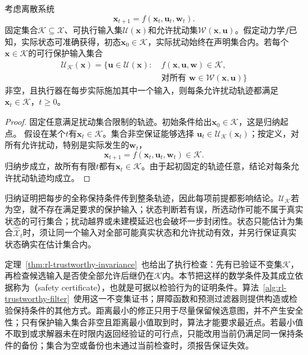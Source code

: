 \begin{theorem}[安全集的一步封闭性保证]
  \label{thm:rl-trustworthy-invariance}
  考虑离散系统
  \[
    \bm{x}_{t+1}=f(\bm{x}_t,\bm{u}_t,\bm{w}_t).
  \]
  固定集合$\mathcal K\subseteq\mathcal X$、可执行输入集$\mathcal U(\bm{x})$和允许扰动集$\mathcal W(\bm{x},\bm{u})$。假定动力学$f$已知，实际状态可准确获得，初态$\bm{x}_0\in\mathcal K$，实际扰动始终在声明集合内。若每个$\bm{x}\in\mathcal K$的可行保护输入集合
  \[
    \begin{aligned}
      \mathcal U_{\mathcal K}(\bm{x})
        =\bigl\{\bm{u}\in\mathcal U(\bm{x}):\ &
          f(\bm{x},\bm{u},\bm{w})\in\mathcal K,\\
        &\text{对所有 }\bm{w}\in\mathcal W(\bm{x},\bm{u})\bigr\}
    \end{aligned}
  \]
  非空，且执行器在每步实际施加其中一个输入，则每条允许扰动轨迹都满足$\bm{x}_t\in\mathcal K$，$t\geq0$。
\end{theorem}
\begin{proof}
  固定任意满足扰动集合限制的轨迹。初始条件给出$\bm{x}_0\in\mathcal K$，这是归纳起点。
  假设在某个$t$有$\bm{x}_t\in\mathcal K$。集合非空保证能够选择
  $\bm{u}_t\in\mathcal U_{\mathcal K}(\bm{x}_t)$；按定义，对所有允许扰动，特别是实际发生的$\bm{w}_t$，
  \[
    \bm{x}_{t+1}=f(\bm{x}_t,\bm{u}_t,\bm{w}_t)\in\mathcal K.
  \]
  归纳步成立，故所有有限$t$都有$\bm{x}_t\in\mathcal K$。由于起初固定的轨迹任意，结论对每条允许扰动轨迹均成立。
\end{proof}

归纳证明把每步的全称保持条件传到整条轨迹，因此每项前提都影响结论。$\mathcal U_{\mathcal K}$若为空，就不存在满足要求的保护输入；状态判断若有误，所选动作可能不属于真实状态的可行集合；扰动越界或未建模延迟也会破坏一步封闭性。状态只能估计为集合$\widehat{\mathcal X}_t$时，须让同一个输入对全部可能真实状态和允许扰动有效，并另行保证真实状态确实在估计集合内。

定理~\ref{thm:rl-trustworthy-invariance}~也给出了执行检查：先有已验证不变集$\mathcal K$，再检查候选输入是否使全部允许后继仍在$\mathcal K$内。本节把这样的数学条件及其成立依据称为（safety certificate），也就是可据以检验行为的证明条件。算法~\ref{alg:rl-trustworthy-filter}~使用这一不变集证书；屏障函数和预测过滤器则提供构造或检验保持条件的其他方式。距离最小的修正只用于尽量保留候选意图，并不产生安全性；只有保护输入集合非空且距离最小值取到时，算法才能要求最近点。若最小值不取到或求解器未在时限内返回经验证的可行点，只能改用当前仍满足同一保持条件的备份；集合为空或备份也未通过当前检查时，须报告保证失效。

